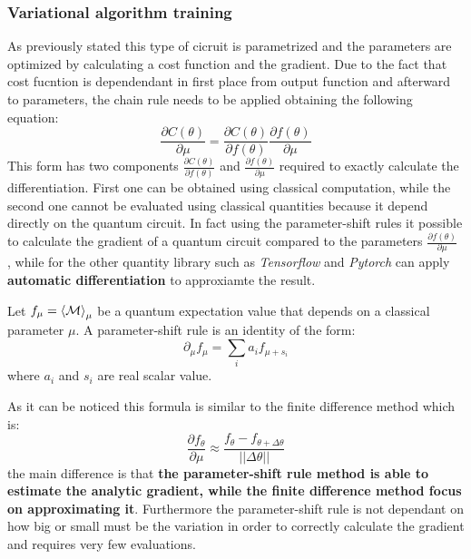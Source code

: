 \subsubsection{Variational algorithm training}
As previously stated this type of cicruit is parametrized and the parameters are optimized by calculating a cost function and the gradient. Due to the fact that cost fucntion is dependendant in first place from output function and afterward to parameters, the chain rule needs to be applied obtaining the following equation:
\begin{equation}
	\frac{\partial C(\theta)}{\partial \mu} = \frac{\partial C(\theta)}{\partial f(\theta)} \frac{\partial f(\theta)}{\partial \mu} 
\end{equation}
This form has two components $\frac{\partial C(\theta)}{\partial f(\theta)}$ and $\frac{\partial f(\theta)}{\partial \mu}$ required to exactly calculate the differentiation. First one can be obtained using classical computation, while the second one cannot be evaluated using classical quantities because it depend directly on the quantum circuit.
In fact using the parameter-shift rules it possible to calculate the gradient of a quantum circuit compared to the parameters $\frac{\partial f(\theta)}{\partial \mu}$ , while for the other quantity library such as \textit{Tensorflow} and \textit{Pytorch} can apply \textbf{automatic differentiation} to approxiamte the result.\\
\begin{mydef}
Let $f_\mu = \braket{\mathcal{M}}_\mu$ be a quantum expectation value that depends on a classical parameter $\mu$. A parameter-shift rule is an identity of the form:
\begin{equation}
	\partial_\mu f_\mu = \sum_{i} a_i f_{\mu + s_i}
\end{equation}
where ${a_i}$ and ${s_i}$ are real scalar value.
\end{mydef}
As it can be noticed this formula is similar to the finite difference method which is:
\begin{equation*}
	\frac{\partial f_\theta}{\partial \mu} \approx \frac{f_\theta - f_{\theta + \Delta \theta}}{||\Delta \theta||}
\end{equation*}
the main difference is that \textbf{the parameter-shift rule method is able to estimate the analytic gradient, while the finite difference method focus on approximating it}. Furthermore the parameter-shift rule is not dependant on how big or small must be the variation in order to correctly calculate the gradient and requires very few evaluations.
